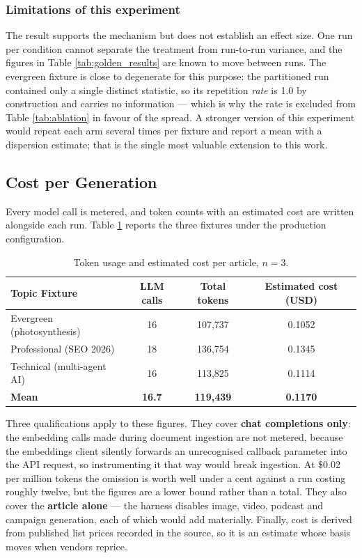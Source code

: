 \subsubsection{Limitations of this experiment}
The result supports the mechanism but does not establish an effect size. One run
per condition cannot separate the treatment from run-to-run variance, and the
figures in Table \ref{tab:golden_results} are known to move between runs. The
evergreen fixture is close to degenerate for this purpose: the partitioned run
contained only a single distinct statistic, so its repetition \emph{rate} is
1.0 by construction and carries no information --- which is why the rate is
excluded from Table \ref{tab:ablation} in favour of the spread. A stronger
version of this experiment would repeat each arm several times per fixture and
report a mean with a dispersion estimate; that is the single most valuable
extension to this work.

\subsection{Cost per Generation}

Every model call is metered, and token counts with an estimated cost are written
alongside each run. Table \ref{tab:cost} reports the three fixtures under the
production configuration.

\begin{table}[ht]
    \centering
    \renewcommand{\arraystretch}{1.3}
    \begin{tabular}{|l|c|c|c|}
        \hline
        \textbf{Topic Fixture} & \textbf{LLM calls} & \textbf{Total tokens} &
        \textbf{Estimated cost (USD)} \\
        \hline
        Evergreen (photosynthesis) & 16 & 107,737 & 0.1052 \\
        \hline
        Professional (SEO 2026) & 18 & 136,754 & 0.1345 \\
        \hline
        Technical (multi-agent AI) & 16 & 113,825 & 0.1114 \\
        \hline
        \textbf{Mean} & \textbf{16.7} & \textbf{119,439} & \textbf{0.1170} \\
        \hline
    \end{tabular}
    \caption{Token usage and estimated cost per article, $n=3$.}
    \label{tab:cost}
\end{table}

Three qualifications apply to these figures. They cover \textbf{chat completions
only}: the embedding calls made during document ingestion are not metered,
because the embeddings client silently forwards an unrecognised callback
parameter into the API request, so instrumenting it that way would break
ingestion. At \$0.02 per million tokens the omission is worth well under a cent
against a run costing roughly twelve, but the figures are a lower bound rather
than a total. They also cover the \textbf{article alone} --- the harness
disables image, video, podcast and campaign generation, each of which would add
materially. Finally, cost is derived from published list prices recorded in the
source, so it is an estimate whose basis moves when vendors reprice.

